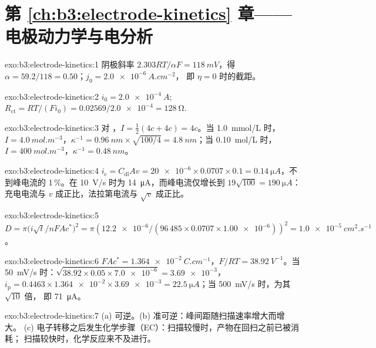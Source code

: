 \section*{第 \ref{ch:b3:electrode-kinetics} 章——电极动力学与电分析}

\begin{solution}{exo:b3:electrode-kinetics:1}
阴极斜率 $2.303RT/\alpha F = \qty{118}{mV}$，得 $\alpha = 59.2/118 = 0.50$；$j_0 = \qty{2.0e-6}{A.cm^{-2}}$，
即 $\eta = 0$ 时的截距。
\end{solution}

\begin{solution}{exo:b3:electrode-kinetics:2}
$i_0 = \qty{2.0e-4}{A}$; $R_{\mathrm{ct}} = RT/(Fi_0) = 0.02569/\num{2.0e-4} = \qty{128}{\ohm}$.
\end{solution}

\begin{solution}{exo:b3:electrode-kinetics:3}
对 ，$I = \frac12(4c + 4c) = 4c$。当 \qty{1.0}{mmol/L} 时，$I = \qty{4.0}{mol.m^{-3}}$，$\kappa^{-1} =
\qty{0.96}{nm} \times \sqrt{100/4} = \qty{4.8}{nm}$；当 \qty{0.10}{mol/L} 时，$I = \qty{400}{mol.m^{-3}}$，$\kappa^{-1} = \qty{0.48}{nm}$。
\end{solution}

\begin{solution}{exo:b3:electrode-kinetics:4}
$i_{\mathrm c} = C_{\mathrm{dl}}Av = \num{20e-6} \times 0.0707 \times 0.1 = \qty{0.14}{\micro A}$，不到峰电流的 1\,\%。在
\qty{10}{V/s} 时为 \qty{14}{\micro A}，而峰电流仅增长到 $19\sqrt{100} = \qty{190}{\micro A}$：
充电电流与 $v$ 成正比，法拉第电流与 $\sqrt v$ 成正比。
\end{solution}

\begin{solution}{exo:b3:electrode-kinetics:5}
$D = \pi\bigl(i\sqrt t/nFAc^*\bigr)^2 = \pi(\num{12.2e-6}/(96\,485 \times 0.0707 \times \num{1.00e-6}))^2 =
\qty{1.0e-5}{cm^2.s^{-1}}$。
\end{solution}

\begin{solution}{exo:b3:electrode-kinetics:6}
$FAc^* = \qty{1.364e-2}{C.cm^{-1}}$，$F/RT = \qty{38.92}{V^{-1}}$。当 \qty{50}{mV/s} 时：$\sqrt{38.92 \times 0.05 \times \num{7.0e-6}} =
\num{3.69e-3}$，$i_{\mathrm p} = 0.4463 \times \num{1.364e-2} \times \num{3.69e-3} = \qty{22.5}{\micro A}$；当 \qty{500}{mV/s} 时，为其 $\sqrt{10}$ 倍，
即 \qty{71}{\micro A}。
\end{solution}

\begin{solution}{exo:b3:electrode-kinetics:7}
(a) 可逆。(b) 准可逆：峰间距随扫描速率增大而增大。
(c) 电子转移之后发生化学步骤（EC）：扫描较慢时，产物在回扫之前已被消耗；
扫描较快时，化学反应来不及进行。
\end{solution}

